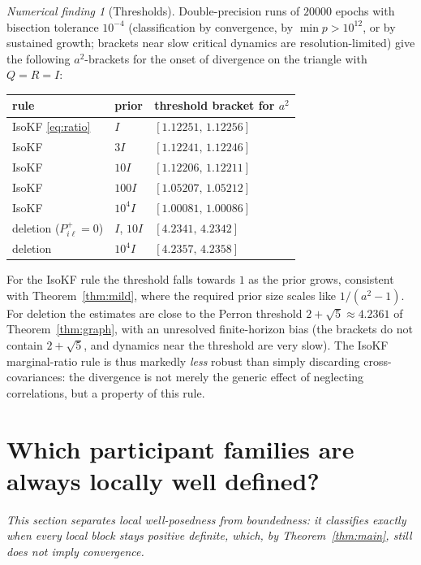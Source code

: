 \documentclass[11pt,a4paper]{article}
\numberwithin{equation}{section}
\theoremstyle{remark}\newtheorem{remark}[theorem]{Remark}
\newtheorem{finding}[theorem]{Numerical finding}
\begin{document}
\begin{finding}[Thresholds]\label{find:thresh}
Double-precision runs of $20000$ epochs with bisection tolerance $10^{-4}$ (classification by
convergence, by $\min p>10^{12}$, or by sustained growth; brackets near slow critical dynamics
are resolution-limited) give the following $a^2$-brackets for the onset of divergence on the
triangle with $Q=R=I$:

\begin{center}\small
\begin{tabular}{@{}lll@{}}
\toprule
rule & prior & threshold bracket for $a^2$\\
\midrule
IsoKF \eqref{eq:ratio} & $I$ & $[1.12251,\,1.12256]$\\
IsoKF & $3I$ & $[1.12241,\,1.12246]$\\
IsoKF & $10I$ & $[1.12206,\,1.12211]$\\
IsoKF & $100I$ & $[1.05207,\,1.05212]$\\
IsoKF & $10^4I$ & $[1.00081,\,1.00086]$\\
deletion ($P_{i\ell}^+=0$) & $I$, $10I$ & $[4.2341,\,4.2342]$\\
deletion & $10^4I$ & $[4.2357,\,4.2358]$\\
\bottomrule
\end{tabular}
\end{center}
\end{finding}

For the IsoKF rule the threshold falls towards $1$ as the prior grows, consistent with
Theorem~\ref{thm:mild}, where the required prior size scales like $1/(a^2-1)$. For deletion the
estimates are close to the Perron threshold $2+\sqrt5\approx4.2361$ of Theorem~\ref{thm:graph}, with an
unresolved finite-horizon bias (the brackets do not contain $2+\sqrt5$, and dynamics near the
threshold are very slow). The IsoKF marginal-ratio rule is
thus markedly \emph{less} robust than simply discarding cross-covariances: the divergence is
not merely the generic effect of neglecting correlations, but a property of this rule.

\section{Which participant families are always locally well defined?}\label{sec:family}

\emph{This section separates local well-posedness from boundedness: it classifies exactly
when every local block stays positive definite, which, by Theorem~\ref{thm:main}, still does not
imply convergence.}
\end{document}

